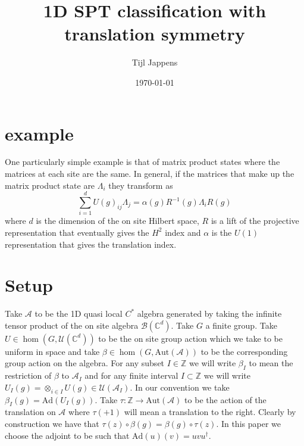 \documentclass[12pt,a4paper,twoside]{article}
\title{1D SPT classification with translation symmetry}
\author{Tijl Jappens}
\date{\today}
\newcommand{\UU}{\mathcal U}
\newcommand{\BB}{\mathcal B}
\newcommand{\ZZ}{\mathbb Z}
\newcommand{\CC}{\mathbb C}
\renewcommand{\AA}{\mathcal A}
\newcommand{\Ad}{\textrm{Ad}}
\theoremstyle{definition}
\numberwithin{equation}{section}
\begin{document}
\section{example}
One particularly simple example is that of matrix product states where the matrices at each site are the same. In general, if the matrices that make up the matrix product state are $\Lambda_i$ they transform as
\begin{equation}
	\sum_{i=1}^d U(g)_{ij}\Lambda_j=\alpha(g) R^{-1}(g)\Lambda_i R(g)
\end{equation}
where $d$ is the dimension of the on site Hilbert space, $R$ is a lift of the projective representation that eventually gives the $H^2$ index and $\alpha$ is the $U(1)$ representation that gives the translation index.
\section{Setup}
Take $\AA$ to be the 1D quasi local $C^*$ algebra generated by taking the infinite tensor product of the on site algebra $\BB(\CC^d)$. Take $G$ a finite group. Take $U\in\hom(G,\UU(\CC^d))$ to be the on site group action which we take to be uniform in space and take $\beta\in\hom(G,\text{Aut}(\AA))$ to be the corresponding group action on the algebra. For any subset $I\in\ZZ$ we will write $\beta_I$ to mean the restriction of $\beta$ to $\AA_I$ and for any finite interval $I\subset\ZZ$ we will write $U_I(g)=\otimes_{i\in I}U(g)\in\UU(\AA_I)$. In our convention we take $\beta_I(g)=\Ad(U_I(g))$. Take $\tau:\ZZ\rightarrow\text{Aut}(\AA)$ to be the action of the translation on $\AA$ where $\tau(+1)$ will mean a translation to the right. Clearly by construction we have that $\tau(z)\circ\beta(g)=\beta(g)\circ\tau(z)$. In this paper we choose the adjoint to be such that $\Ad(u)(v)=uvu^\dagger$.
\end{document}
